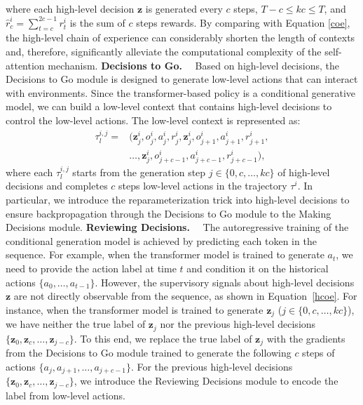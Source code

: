 \documentclass{article}
\theoremstyle{plain}
\theoremstyle{definition}
\theoremstyle{remark}
\begin{document}
where each high-level decision $\textbf{z}$ is generated every $c$ steps, $T-c\leq kc \leq T$, and $\hat{r}_c^i=\sum_{t=c}^{2c-1}{r_t^i}$ is the sum of $c$ steps rewards. By comparing with Equation \eqref{coe}, the high-level chain of experience can considerably shorten the length of contexts and, therefore, significantly alleviate the computational complexity of the self-attention mechanism.
\noindent\textbf{Decisions to Go.}~~
Based on high-level decisions, the Decisions to Go module is designed to generate low-level actions that can interact with environments. Since the transformer-based policy is a conditional generative model, we can build a low-level context that contains high-level decisions to control the low-level actions. The low-level context is represented as:
\begin{equation}
\begin{aligned}
\tau_l^{i,j}=&(\textbf{z}_j^i,o_j^i,a_j^i,r_j^i, \textbf{z}_{j}^i,o_{j+1}^i,a_{j+1}^i,r_{j+1}^i, \\ &\dots,\textbf{z}_{j}^i,o_{j+c-1}^i,a_{j+c-1}^i,r_{j+c-1}^i),
\label{lcoe}
\end{aligned}
\end{equation}
where each $\tau_l^{i,j}$ starts from the generation step $j\in\{0,c,\dots,kc\}$ of high-level decisions and completes $c$ steps low-level actions in the trajectory $\tau^i$. In particular, we introduce the reparameterization trick \cite{20} into high-level decisions to ensure backpropagation through the Decisions to Go module to the Making Decisions module.
\noindent\textbf{Reviewing Decisions.}~~
The autoregressive training of the conditional generation model is achieved by predicting each token in the sequence.
For example, when the transformer model is trained to generate $a_t$, we need to provide the action label at time $t$ and condition it on the historical actions $\{a_0,\dots,a_{t-1}\}$. However, the supervisory signals about high-level decisions $\textbf{z}$ are not directly observable from the sequence, as shown in Equation~\eqref{hcoe}. For instance, when the transformer model is trained to generate $\textbf{z}_{j}$ ($j\in\{0,c,\dots,kc\}$), we have neither the true label of $\textbf{z}_{j}$ nor the previous high-level decisions $\{\textbf{z}_0,\textbf{z}_c,\dots,\textbf{z}_{j-c}\}$.
To this end, we replace the true label of $\textbf{z}_{j}$ with the gradients from the Decisions to Go module trained to generate the following $c$ steps of actions $\{a_{j},a_{j+1},\dots,a_{j+c-1}\}$. For the previous high-level decisions $\{\textbf{z}_0,\textbf{z}_c,\dots,\textbf{z}_{j-c}\}$, we introduce the Reviewing Decisions module to encode the label from low-level actions.
\end{document}
